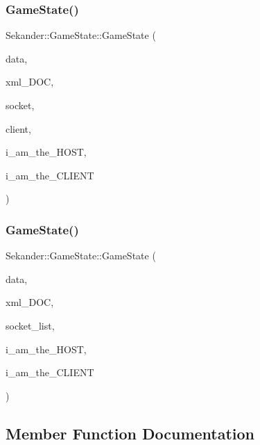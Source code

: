 \subsubsection{\texorpdfstring{Game\+State()}{GameState()}\hspace{0.1cm}{\footnotesize\ttfamily [5/6]}}
{\footnotesize\ttfamily Sekander\+::\+Game\+State\+::\+Game\+State (\begin{DoxyParamCaption}\item[{\hyperlink{namespaceSekander_a1d69b002ba2d23020901c28f0def5e16}{Game\+Data\+Ref}}]{data,  }\item[{const char $\ast$}]{xml\+\_\+\+D\+OC,  }\item[{sf\+::\+Tcp\+Socket $\ast$}]{socket,  }\item[{sf\+::\+Tcp\+Socket $\ast$}]{client,  }\item[{bool}]{i\+\_\+am\+\_\+the\+\_\+\+H\+O\+ST,  }\item[{bool}]{i\+\_\+am\+\_\+the\+\_\+\+C\+L\+I\+E\+NT }\end{DoxyParamCaption})}

\mbox{\label{classSekander_1_1GameState_a80541160bcb4bc8edbc1a54bff777817}} 
\subsubsection{\texorpdfstring{Game\+State()}{GameState()}\hspace{0.1cm}{\footnotesize\ttfamily [6/6]}}
{\footnotesize\ttfamily Sekander\+::\+Game\+State\+::\+Game\+State (\begin{DoxyParamCaption}\item[{\hyperlink{namespaceSekander_a1d69b002ba2d23020901c28f0def5e16}{Game\+Data\+Ref}}]{data,  }\item[{const char $\ast$}]{xml\+\_\+\+D\+OC,  }\item[{std\+::vector$<$ sf\+::\+Tcp\+Socket $\ast$$>$}]{socket\+\_\+list,  }\item[{bool}]{i\+\_\+am\+\_\+the\+\_\+\+H\+O\+ST,  }\item[{bool}]{i\+\_\+am\+\_\+the\+\_\+\+C\+L\+I\+E\+NT }\end{DoxyParamCaption})}



\subsection{Member Function Documentation}
\mbox{\label{classSekander_1_1GameState_ae940d623e220e069c6574810c5d083be}} 
